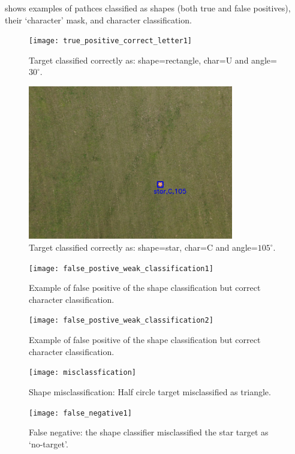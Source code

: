 \documentclass{article} %
\begin{document}
 shows examples of pathces classified as shapes (both true and false positives),
their `character' mask, and character classification.
\begin{figure}[h]
	\centering
	\texttt{[image: true\_positive\_correct\_letter1]}
	\caption{Target classified correctly as: shape=rectangle, char=U and angle=$30^\circ$.}
	\label{fig:true_positive1}
\end{figure}
\begin{figure}[h]
	\centering
	\includegraphics[width=0.8\textwidth]{true_positive_correct_letter2}
	\caption{Target classified correctly as: shape=star, char=C and angle=$105^\circ$.}
	\label{fig:true_positive2}
\end{figure}
\begin{figure}[h]
	\centering
	\texttt{[image: false\_postive\_weak\_classification1]}
	\caption{Example of false positive of the shape classification but correct character classification.}
	\label{fig:false_positive1}
\end{figure}
\begin{figure}[h]
	\centering
	\texttt{[image: false\_postive\_weak\_classification2]}
	\caption{Example of false positive of the shape classification but correct character classification.}
	\label{fig:false_positive2}
\end{figure}
\begin{figure}[h]
	\centering
	\texttt{[image: misclassfication]}
	\caption{Shape misclassification: Half circle target misclassified as triangle.}
	\label{fig:misclass}
\end{figure}
\begin{figure}[h]
	\centering
	\texttt{[image: false\_negative1]}
	\caption{False negative: the shape classifier misclassified the star target as `no-target'.}
	\label{fig:false_negative1}
\end{figure}
\end{document}
